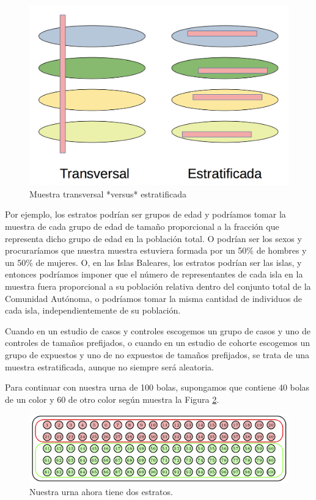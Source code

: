 \documentclass[
]{book}
\theoremstyle{definition}
\theoremstyle{definition}
\theoremstyle{definition}
\theoremstyle{definition}
\theoremstyle{remark}
\begin{document}
\begin{figure}

{\centering \includegraphics[width=0.6\linewidth]{INREMDN_files/figure-html/estratvstrans} 

}

\caption{Muestra transversal *versus* estratificada}\label{fig:unnamed-chunk-73}
\end{figure}

Por ejemplo, los estratos podrían ser grupos de edad y podríamos tomar la muestra de cada grupo de edad de tamaño proporcional a la fracción que representa dicho grupo de edad en la población total. O podrían ser los sexos y procuraríamos que nuestra muestra estuviera formada por un 50\% de hombres y un 50\% de mujeres. O, en las Islas Baleares, los estratos podrían ser las islas, y entonces podríamos imponer que el número de representantes de cada isla en la muestra fuera proporcional a su población relativa dentro del conjunto total de la Comunidad Autónoma, o podríamos tomar la misma cantidad de individuos de cada isla, independientemente de su población.

\begin{rmdnote}
Cuando en un estudio de casos y controles escogemos un grupo de casos y uno de controles de tamaños prefijados, o cuando en un estudio de cohorte escogemos un grupo de expuestos y uno de no expuestos de tamaños prefijados, se trata de una muestra estratificada, aunque no siempre será aleatoria.
\end{rmdnote}

Para continuar con nuestra urna de 100 bolas, supongamos que contiene 40 bolas de un color y 60 de otro color según muestra la Figura \ref{fig:estratprevi}.

\begin{figure}

{\centering \includegraphics[width=0.8\linewidth]{INREMDN_files/figure-html/estratprevi} 

}

\caption{Nuestra urna ahora tiene dos  estratos.}\label{fig:estratprevi}
\end{figure}
\end{document}
